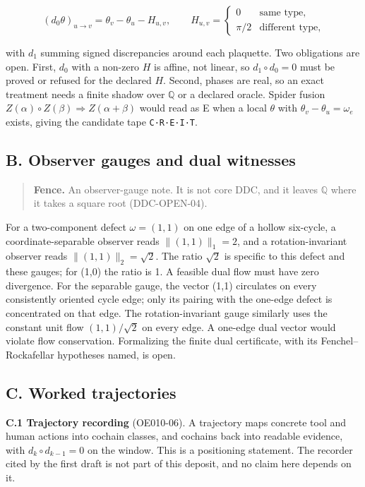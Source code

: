 \documentclass[
  11pt,
]{article}
\renewcommand{\_}{\ddcunderscore\allowbreak}
\begin{document}
\[(d_0 \theta)_{u \to v} = \theta_v - \theta_u - H_{u,v}, \qquad
H_{u,v} = \begin{cases} 0 & \text{same type,} \\ \pi/2 & \text{different type,} \end{cases}\]

with \(d_1\) summing signed discrepancies around each plaquette. Two
obligations are open. First, \(d_0\) with a non-zero \(H\) is affine,
not linear, so \(d_1 \circ d_0 = 0\) must be proved or refused for the
declared \(H\). Second, phases are real, so an exact treatment needs a
finite shadow over \(\mathbb{Q}\) or a declared oracle. Spider fusion
\(Z(\alpha) \circ Z(\beta) \Rightarrow
Z(\alpha + \beta)\) would read as E when a local \(\theta\) with
\(\theta_v - \theta_u = \omega_e\) exists, giving the candidate tape
\texttt{C·R·E·I·T}.

\subsection{B. Observer gauges and dual
witnesses}\label{b.-observer-gauges-and-dual-witnesses}

\begin{quote}
\textbf{Fence.} An observer-gauge note. It is not core DDC, and it
leaves \(\mathbb{Q}\) where it takes a square root (DDC-OPEN-04).
\end{quote}

For a two-component defect \(\omega = (1, 1)\) on one edge of a hollow
six-cycle, a coordinate-separable observer reads
\(\lVert (1,1) \rVert_1 = 2\), and a rotation-invariant observer reads
\(\lVert (1,1) \rVert_2 = \sqrt{2}\). The ratio \(\sqrt{2}\) is specific
to this defect and these gauges; for (1,0) the ratio is 1. A feasible
dual flow must have zero divergence. For the separable gauge, the vector
(1,1) circulates on every consistently oriented cycle edge; only its
pairing with the one-edge defect is concentrated on that edge. The
rotation-invariant gauge similarly uses the constant unit flow
\((1,1)/\sqrt{2}\) on every edge. A one-edge dual vector would violate
flow conservation. Formalizing the finite dual certificate, with its
Fenchel--Rockafellar hypotheses named, is open.

\subsection{C. Worked trajectories}\label{c.-worked-trajectories}

\textbf{C.1 Trajectory recording} (OE010-06). A trajectory maps concrete
tool and human actions into cochain classes, and cochains back into
readable evidence, with \(d_{k} \circ d_{k-1} = 0\) on the window. This
is a positioning statement. The recorder cited by the first draft is not
part of this deposit, and no claim here depends on it.
\end{document}
